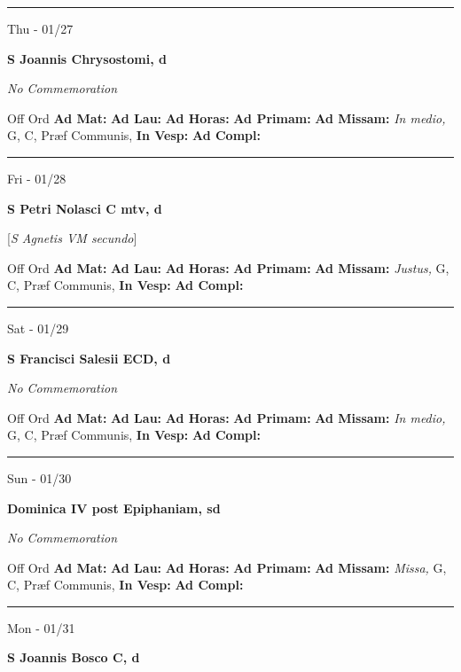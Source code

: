 \documentclass[letterpaper, 10pt]{article}
\begin{document}
\hrule
\begin{center}
Thu - 01/27
\end{center}\textbf{ \large S Joannis Chrysostomi, \textnormal{\normalsize d}}

\textit{No Commemoration}\begin{justify}
Off Ord
\textbf{Ad Mat: }
\textbf{Ad Lau: }
\textbf{Ad Horas: }
\textbf{Ad Primam: }
\textbf{Ad Missam:} \textit{In medio, } G, C, Præf Communis, 
\textbf{In Vesp: }
\textbf{Ad Compl: }\end{justify}



\hrule
\begin{center}
Fri - 01/28
\end{center}\textbf{ \large S Petri Nolasci C mtv, \textnormal{\normalsize d}}

[\textit{S Agnetis VM secundo}]
\begin{justify}
Off Ord
\textbf{Ad Mat: }
\textbf{Ad Lau: }
\textbf{Ad Horas: }
\textbf{Ad Primam: }
\textbf{Ad Missam:} \textit{Justus, } G, C, Præf Communis, 
\textbf{In Vesp: }
\textbf{Ad Compl: }\end{justify}



\hrule
\begin{center}
Sat - 01/29
\end{center}\textbf{ \large S Francisci Salesii ECD, \textnormal{\normalsize d}}

\textit{No Commemoration}\begin{justify}
Off Ord
\textbf{Ad Mat: }
\textbf{Ad Lau: }
\textbf{Ad Horas: }
\textbf{Ad Primam: }
\textbf{Ad Missam:} \textit{In medio, } G, C, Præf Communis, 
\textbf{In Vesp: }
\textbf{Ad Compl: }\end{justify}



\hrule
\begin{center}
Sun - 01/30
\end{center}\textbf{ \large Dominica IV post Epiphaniam, \textnormal{\normalsize sd}}

\textit{No Commemoration}\begin{justify}
Off Ord
\textbf{Ad Mat: }
\textbf{Ad Lau: }
\textbf{Ad Horas: }
\textbf{Ad Primam: }
\textbf{Ad Missam:} \textit{Missa, } G, C, Præf Communis, 
\textbf{In Vesp: }
\textbf{Ad Compl: }\end{justify}



\hrule
\begin{center}
Mon - 01/31
\end{center}\textbf{ \large S Joannis Bosco C, \textnormal{\normalsize d}}
\end{document}
